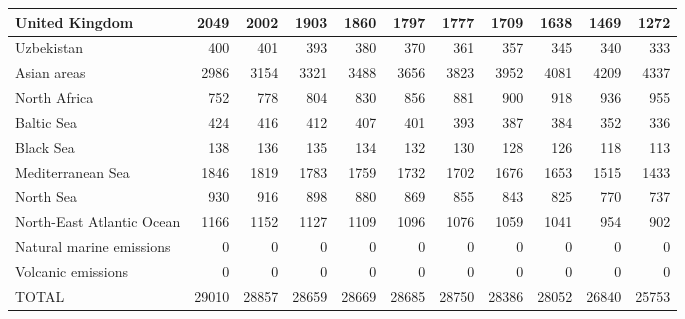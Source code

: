 \begin{table}
\begin{tabular}{|l|r|r|r|r|r|r|r|r|r|r|}
                United Kingdom&   2049&   2002&   1903&   1860&   1797&   1777&   1709&   1638&   1469&   1272\\\hline
                    Uzbekistan&    400&    401&    393&    380&    370&    361&    357&    345&    340&    333\\\hline
                   Asian areas&   2986&   3154&   3321&   3488&   3656&   3823&   3952&   4081&   4209&   4337\\\hline
                  North Africa&    752&    778&    804&    830&    856&    881&    900&    918&    936&    955\\\hline
                    Baltic Sea&    424&    416&    412&    407&    401&    393&    387&    384&    352&    336\\\hline
                     Black Sea&    138&    136&    135&    134&    132&    130&    128&    126&    118&    113\\\hline
             Mediterranean Sea&   1846&   1819&   1783&   1759&   1732&   1702&   1676&   1653&   1515&   1433\\\hline
                     North Sea&    930&    916&    898&    880&    869&    855&    843&    825&    770&    737\\\hline
     North-East Atlantic Ocean&   1166&   1152&   1127&   1109&   1096&   1076&   1059&   1041&    954&    902\\\hline
      Natural marine emissions&      0&      0&      0&      0&      0&      0&      0&      0&      0&      0\\\hline
            Volcanic emissions&      0&      0&      0&      0&      0&      0&      0&      0&      0&      0\\\hline\hline
                         TOTAL&  29010&  28857&  28659&  28669&  28685&  28750&  28386&  28052&  26840&  25753\\\hline
 \end{tabular}
 \end{table}
 
